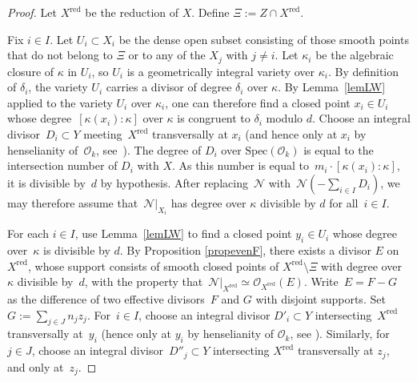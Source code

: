 \documentclass{amsart}
\theoremstyle{definition}
\theoremstyle{remark}
\numberwithin{equation}{section}
\newcommand{\red}{\mathrm{red}}
\newcommand{\Spec}{\mathrm{Spec}}
\def\cN{\mathcal{N}}
\def\cO{\mathcal{O}}
\begin{document}
\begin{proof}
Let $X^{\red}$ be the reduction of $X$. Define $\Xi:=Z\cap X^{\red}$.

Fix $i\in I$. Let $U_i\subset X_i$ be the dense open subset consisting of those smooth points that do not belong to $\Xi$ or to any of the $X_j$ with $j\neq i$. Let $\kappa_i$ be the algebraic closure of $\kappa$ in $U_i$, so $U_i$ is a geometrically integral variety over $\kappa_i$.
By definition of $\delta_i$, the variety $U_i$ carries a divisor of degree $\delta_i$ over $\kappa$.
 By Lemma~\ref{lemLW} applied to the variety $U_i$ over $\kappa_i$, one can therefore find a closed point $x_i\in U_i$ whose degree~$[\kappa(x_i):\kappa]$ over $\kappa$ is congruent to $\delta_i$ modulo $d$.
 Choose an integral divisor~$D_i\subset Y$ meeting~$X^{\red}$ transversally at $x_i$ (and hence only at $x_i$ by henselianity of~$\cO_k$, see~\cite[Lemma~\href{https://stacks.math.columbia.edu/tag/04GH}{04GH}\,(1)]{SP}). The degree of $D_i$ over $\Spec(\cO_k)$ is equal to the intersection number of $D_i$ with $X$. As this number is equal to~${m_i\cdot[\kappa(x_i):\kappa]}$, it is divisible by~$d$ by hypothesis.
After replacing~$\cN$ with~$\cN(-\sum_{i\in I}D_i)$, we may therefore assume that~$\cN|_{X_i}$ has degree over $\kappa$ divisible by $d$ for all~$i\in I$.

For each $i\in I$, use Lemma~\ref{lemLW} to find a closed point $y_i\in U_i$
whose degree over~$\kappa$ is divisible by $d$. 
By Proposition \ref{propevenF}, there exists a divisor $E$ on $X^{\red}$, whose support consists of smooth closed points of $X^{\red}\setminus \Xi$ with degree over $\kappa$ divisible by~$d$, with the property that~${\cN|_{X^{\red}}\simeq\cO_{X^{\red}}(E)}$. Write~$E=F-G$ as the difference of two effective divisors~$F$ and $G$ with disjoint supports. 
Set $G:=\sum_{j\in J} n_jz_j$. 
For~$i\in I$, choose an integral divisor $D'_i\subset Y$ intersecting~$X^{\red}$ transversally at~$y_i$ (hence only at $y_i$ by henselianity of $\cO_k$, see \cite[Lemma~\href{https://stacks.math.columbia.edu/tag/04GH}{04GH}\,(1)]{SP}). Similarly, for~$j\in J$, choose an integral divisor~$D''_j\subset Y$ intersecting $X^{\red}$ transversally at $z_j$, and only at~$z_j$.


\end{proof}
\end{document}
